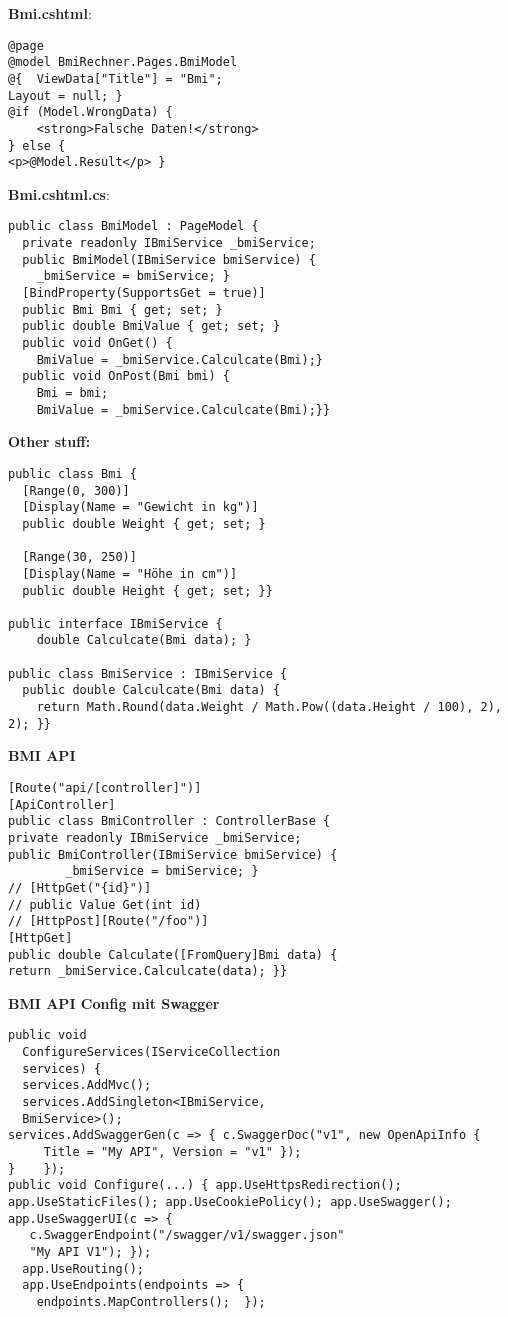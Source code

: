 \textbf{Bmi.cshtml}:
\begin{lstlisting}[style=CSharp]
@page
@model BmiRechner.Pages.BmiModel
@{  ViewData["Title"] = "Bmi";
Layout = null; }
@if (Model.WrongData) {
    <strong>Falsche Daten!</strong>
} else {
<p>@Model.Result</p> }
\end{lstlisting}




\textbf{Bmi.cshtml.cs}:
\begin{lstlisting}[style=CSharp]
public class BmiModel : PageModel {
  private readonly IBmiService _bmiService;
  public BmiModel(IBmiService bmiService) {
    _bmiService = bmiService; }
  [BindProperty(SupportsGet = true)]
  public Bmi Bmi { get; set; }
  public double BmiValue { get; set; }
  public void OnGet() {
    BmiValue = _bmiService.Calculcate(Bmi);}
  public void OnPost(Bmi bmi) {
    Bmi = bmi;
    BmiValue = _bmiService.Calculcate(Bmi);}}
\end{lstlisting}

\textbf{Other stuff:}
\begin{lstlisting}[style=CSharp]
public class Bmi {
  [Range(0, 300)]
  [Display(Name = "Gewicht in kg")]
  public double Weight { get; set; }

  [Range(30, 250)]
  [Display(Name = "Höhe in cm")]
  public double Height { get; set; }}

public interface IBmiService {
    double Calculcate(Bmi data); }

public class BmiService : IBmiService {
  public double Calculcate(Bmi data) {
    return Math.Round(data.Weight / Math.Pow((data.Height / 100), 2), 2); }}
\end{lstlisting}

\textbf{BMI API}
\begin{lstlisting}[style=CSharp]
[Route("api/[controller]")]
[ApiController]
public class BmiController : ControllerBase {
private readonly IBmiService _bmiService;
public BmiController(IBmiService bmiService) {
        _bmiService = bmiService; }
// [HttpGet("{id}")]
// public Value Get(int id)
// [HttpPost][Route("/foo")]
[HttpGet]
public double Calculate([FromQuery]Bmi data) {
return _bmiService.Calculcate(data); }}
\end{lstlisting}

\textbf{BMI API Config mit Swagger}
\begin{lstlisting}[style=CSharp]
public void
  ConfigureServices(IServiceCollection
  services) {
  services.AddMvc();
  services.AddSingleton<IBmiService,
  BmiService>();
services.AddSwaggerGen(c => { c.SwaggerDoc("v1", new OpenApiInfo {
     Title = "My API", Version = "v1" });
}    });
public void Configure(...) { app.UseHttpsRedirection(); app.UseStaticFiles(); app.UseCookiePolicy(); app.UseSwagger(); app.UseSwaggerUI(c => {
   c.SwaggerEndpoint("/swagger/v1/swagger.json"
   "My API V1"); });
  app.UseRouting();
  app.UseEndpoints(endpoints => {
    endpoints.MapControllers();  });
\end{lstlisting}
